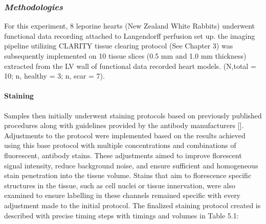 \subsubsection{\textit{Methodologies}}

For this experiment, 8 leporine hearts (New Zealand White Rabbits) underwent functional data recording attached to Langendorff perfusion set up. the imaging pipeline utilizing CLARITY tissue clearing protocol (See Chapter 3) was subsequently implemented on 10 tissue slices (0.5 mm and 1.0 mm thickness) extracted from the LV wall of functional data recorded heart models. (N,total = 10; n, healthy = 3; n, scar = 7). 

\paragraph{Staining}

Samples then initially underwent staining protocols based on previously published procedures along with guidelines provided by the antibody manufacturers []. Adjustments to the protocol were implemented based on the results achieved using this base protocol with multiple concentrations and combinations of fluorescent, antibody stains. These adjustments aimed to improve florescent signal intensity, reduce background noise, and ensure sufficient and homogeneous stain penetration into the tissue volume. Stains that aim to florescence specific structures in the tissue, such as cell nuclei or tissue innervation, were also examined to ensure labelling in these channels remained specific with every adjustment made to the initial protocol. The finalized staining protocol created is described with precise timing steps with timings and volumes in Table 5.1:

